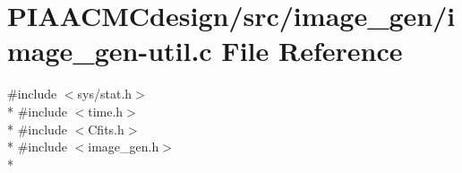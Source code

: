 \hypertarget{PIAACMCdesign_2src_2image__gen_2image__gen-util_8c}{\section{P\+I\+A\+A\+C\+M\+Cdesign/src/image\+\_\+gen/image\+\_\+gen-\/util.c File Reference}
\label{PIAACMCdesign_2src_2image__gen_2image__gen-util_8c}
}
{\ttfamily \#include $<$sys/stat.\+h$>$}\\*
{\ttfamily \#include $<$time.\+h$>$}\\*
{\ttfamily \#include $<$Cfits.\+h$>$}\\*
{\ttfamily \#include $<$image\+\_\+gen.\+h$>$}\\*
